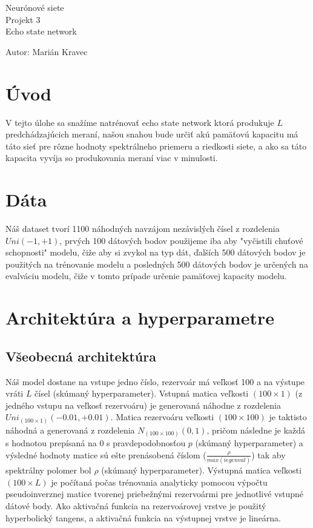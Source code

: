 \documentclass[a4paper]{article}
\begin{document}
 
	
	\pagestyle{plain}
	
	\begin{center}
		\sc\large
		Neurónové siete\\
		Projekt 3\\
		Echo state network
	\end{center}
	
	Autor: Marián Kravec
	\\
	
	\section{Úvod}
	
	V tejto úlohe sa snažíme natrénovať echo state network ktorá produkuje $L$ predchádzajúcich meraní, našou snahou bude určiť akú pamäťovú kapacitu má táto sieť pre rôzne hodnoty spektrálneho priemeru a riedkosti siete, a ako sa táto kapacita vyvíja so produkovania meraní viac v minulosti.
	
	\section{Dáta}
	
	Náš dataset tvorí 1100 náhodných navzájom nezávislých čísel z rozdelenia $Uni(-1,+1)$, prvých 100 dátových bodov použijeme iba aby "vyčistili chuťové schopnosti" modelu, čiže aby si zvykol na typ dát, ďalších 500 dátových bodov je použitých na trénovanie modelu a posledných 500 dátových bodov je určených na evalváciu modelu, čiže v tomto prípade určenie pamäťovej kapacity modelu.
	
	\section{Architektúra a hyperparametre}
	
	\subsection*{Všeobecná architektúra}
	
	Náš model dostane na vstupe jedno číslo, rezervoár má veľkosť 100 a na výstupe vráti $L$ čísel (skúmaný hyperparameter). Vstupná matica veľkosti $(100\times1)$ (z jedného vstupu na veľkosť rezervoáru) je generovaná náhodne z rozdelenia $Uni_{(100\times1)}(-0.01, +0.01)$. Matica rezervoáru veľkosti $(100\times100)$ je taktisto náhodná a generovaná z rozdelenia $N_{(100\times100)}(0,1)$, pričom následne je každá s hodnotou prepísaná na $0$ s pravdepodobnosťou $p$ (skúmaný hyperparameter) a výsledné hodnoty matice sú ešte prenásobená číslom ($\frac{\rho}{max(iegenval)}$) tak aby spektrálny polomer bol $\rho$ (skúmaný hyperparameter). Výstupná matica veľkosti $(100\times L)$ je počítaná počas trénovania analyticky pomocou výpočtu pseudoinverznej matice tvorenej priebežnými rezervoármi pre jednotlivé vstupné dátové body. Ako aktivačná funkcia na rezervoárovej vrstve je použitý hyperbolický tangens, a aktivačná funkcia na výstupnej vrstve je lineárna.
	
\end{document}
